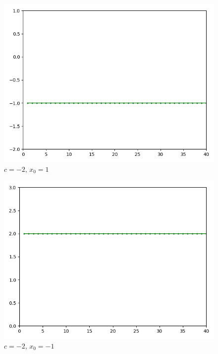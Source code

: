 \documentclass[]{article}
\begin{document}
\begin{figure}[!htbp]
	\includegraphics[scale=1]{task6-21}
	\centering
	\caption{$c = -2$, $x_0 = 1$}
\end{figure}
\clearpage
\begin{figure}[!htbp]
	\includegraphics[scale=1]{task6-22}
	\centering
	\caption{$c = -2$, $x_0 = -1$}
\end{figure}
\end{document}
